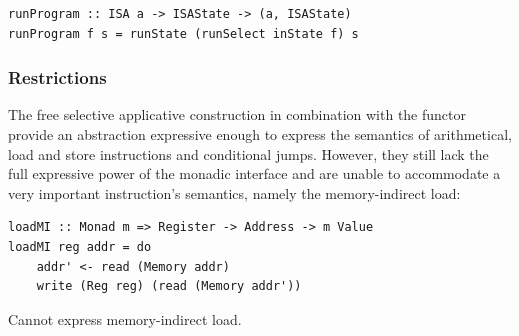 \begin{verbatim}
runProgram :: ISA a -> ISAState -> (a, ISAState)
runProgram f s = runState (runSelect inState f) s
\end{verbatim}

\subsubsection{\textbf{Restrictions}}

The free selective applicative construction in combination with the  functor
provide an abstraction expressive enough to express the
semantics of arithmetical, load and store instructions and conditional jumps. However,
they still lack the full expressive power of the monadic interface and are unable
to accommodate a very important instruction's semantics, namely the memory-indirect load:

\begin{verbatim}
loadMI :: Monad m => Register -> Address -> m Value
loadMI reg addr = do
    addr' <- read (Memory addr)
    write (Reg reg) (read (Memory addr'))
\end{verbatim}

Cannot express memory-indirect load.